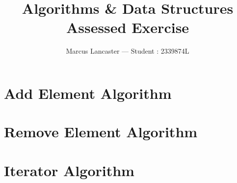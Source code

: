 \documentclass[a4paper, 12pt]{article}
\title{Algorithms \& Data Structures\\Assessed Exercise}
\author{Marcus Lancaster --- Student \textnumero: 2339874L}
\date{}
\begin{document}
\maketitle
\section*{Add Element Algorithm}

\section*{Remove Element Algorithm}

\section*{Iterator Algorithm}

\end{document}
